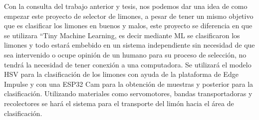 Con la consulta del trabajo anterior y tesis, nos podemos dar una idea de como empezar este proyecto de selector de limones, a pesar de tener un mismo objetivo que es clasificar los limones en buenos y malos, este proyecto se diferencia en que se utilizara “Tiny Machine Learning, es decir mediante ML se clasificaron los limones y todo estará embebido en un sistema independiente sin necesidad de que sea intervenido o ocupe opinión de un humano para su proceso de selección, no tendrá la necesidad de tener conexión a una computadora. Se utilizará el modelo HSV para la clasificación de los limones con ayuda de la plataforma de Edge Impulse y con una ESP32 Cam para la obtención de muestras y posterior para la clasificación. Utilizando materiales como servomotores, bandas transportadoras y recolectores se hará el sistema para el transporte del limón hacia el área de clasificación. 
